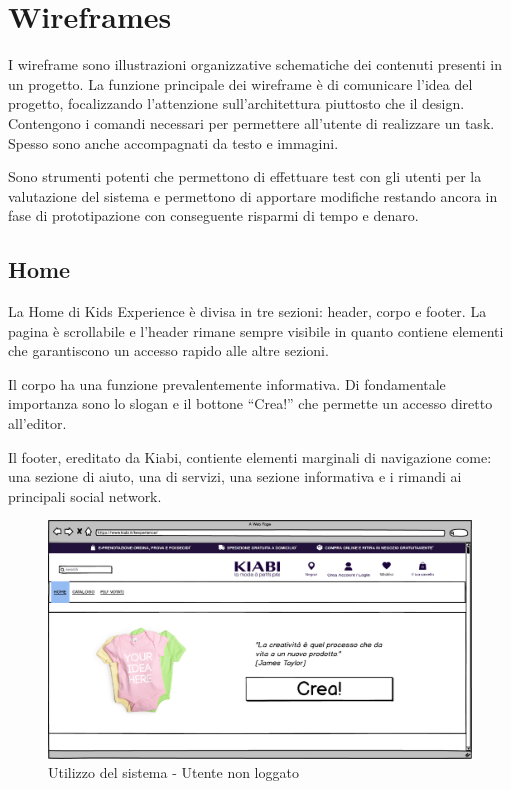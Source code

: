 \documentclass[12pt,italian,]{report}
\begin{document}
\hypertarget{wireframes}{%
\section{Wireframes}\label{wireframes}}

I wireframe sono illustrazioni organizzative schematiche dei contenuti
presenti in un progetto. La funzione principale dei wireframe è di
comunicare l'idea del progetto, focalizzando l'attenzione
sull'architettura piuttosto che il design. Contengono i comandi
necessari per permettere all'utente di realizzare un task. Spesso sono
anche accompagnati da testo e immagini. 

Sono strumenti potenti che
permettono di effettuare test con gli utenti per la valutazione del
sistema e permettono di apportare modifiche restando ancora in fase di
prototipazione con conseguente risparmi di tempo e denaro.

\hypertarget{home}{%
\subsection{Home}\label{home}}

La Home di Kids Experience è divisa in tre sezioni: header, corpo e footer. La pagina è scrollabile e l'header rimane sempre visibile in quanto contiene elementi che garantiscono un accesso rapido alle altre sezioni.

Il corpo ha una funzione prevalentemente informativa. Di fondamentale importanza sono lo slogan e il bottone ``Crea!'' che permette un accesso diretto all'editor.

Il footer, ereditato da Kiabi, contiente elementi marginali di navigazione come: una sezione di aiuto, una di servizi, una sezione informativa e i rimandi ai principali social network.

\begin{figure}[h]
\centering
\includegraphics{../balsamiq/balsamiq_finale/HomeSottositoUtenteEsterno.png}
\caption{Utilizzo del sistema - Utente non loggato}
\end{figure}
\end{document}
